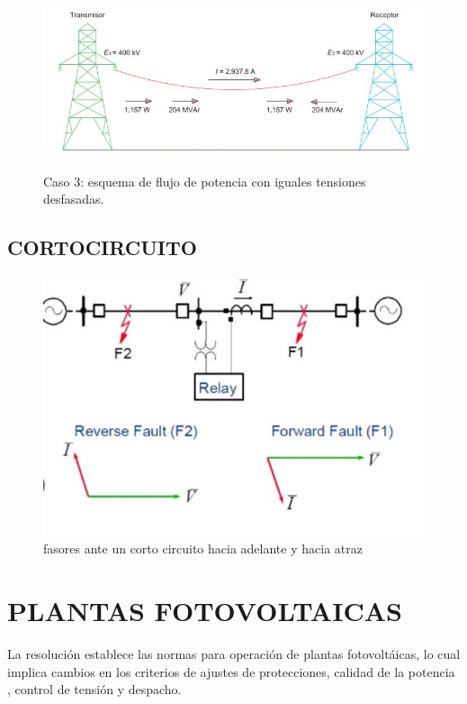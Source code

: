 \documentclass[a5paper]{book}%
\begin{document}
\begin{figure}[H]
  \centering
  \caption{Caso 3: esquema de flujo de potencia con iguales tensiones
    desfasadas.}
  \includegraphics[width=\linewidth]{tensionesigualesdesfasadas}
  \label{fig:caso3}
\end{figure}

\section{CORTOCIRCUITO}

\begin{figure}[H]
  \centering
  \caption{fasores ante un corto circuito hacia adelante y hacia atraz}
  \label{fig:fasores}
  \includegraphics[width=\linewidth]{cortcircuito}
  \end{figure}

\chapter{PLANTAS FOTOVOLTAICAS}

La resolución \cite{CREG-060-2019} establece las normas para operación
de plantas fotovoltáicas, lo  cual implica cambios en los criterios de
ajustes de protecciones, calidad de la potencia ,  control de tensión
y despacho.
\end{document}
